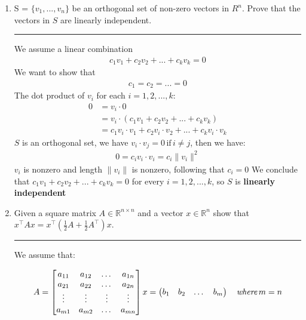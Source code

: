 \documentclass[12pt]{article}
\begin{document}
\begin{enumerate}
    \item S = $\{v_1, ... , v_n\}$ be an orthogonal set of non-zero vectors in $R^n$. Prove that the vectors in $S$ are linearly independent.

    \noindent\rule{\linewidth}{1pt}

    We assume a linear combination
    \begin{align*} 
        c_1 v_1 + c_2 v_2 + ... + c_k v_k = 0
    \end{align*}
    We want to show that
    \begin{align*} 
        c_1 = c_2 = ... = 0
    \end{align*}
    The dot product of $v_i$ for each $ i = 1,2, ... , k $:
    \begin{align*} 
        0 &= v_i \cdot 0 \\
          &= v_i \cdot (c_1 v_1 + c_2 v_2 + ... + c_k v_k) \\
          &= c_1 v_i \cdot v_1 + c_2 v_i \cdot v_2 + ... + c_k v_i \cdot v_k
    \end{align*}
    $S$ is an orthogonal set, we have $v_i \cdot v_j = 0 \, \textrm{if} \, i \neq j $, then we have:
    \begin{align*} 
        0 = c_i v_i \cdot v_i = c_i \|v_i\|^2
    \end{align*}
    $v_i$ is nonzero and length $\|v_i\|$ is nonzero, following that $c_i = 0$ \newline
    We conclude that $c_1 v_1 + c_2 v_2 + ... + c_k v_k = 0$ for every $ i = 1,2, ... , k $, so $S$ is \textbf{linearly independent}

    \item Given a square matrix $A \in \mathbb{R}^{n \times n}$ and a vector $x \in \mathbb{R}^n$ show that $x^\intercal Ax = x^\intercal ( \frac{1}{2} A + \frac{1}{2} A^\intercal )x$.
    
    \noindent\rule{\linewidth}{1pt}

    We assume that:

    \begin{align*} 
        A = 
        \begin{bmatrix}
            a_{11}    &   a_{12}    & \dots     &   a_{1n}    \\
            a_{21}    &   a_{22}    & \dots     &   a_{2n}    \\
            \vdots    &  \vdots     & \vdots    &   \vdots    \\   
            a_{m1}    &   a_{m2}    & \dots     &   a_{mn}    \\
        \end{bmatrix}
        x = 
        \begin{pmatrix}
            b_1     &
            b_2     &
            \dots  &
            b_m
        \end{pmatrix}
        \quad \emph{where} \, m = n
    \end{align*}


\end{enumerate}
\end{document}
